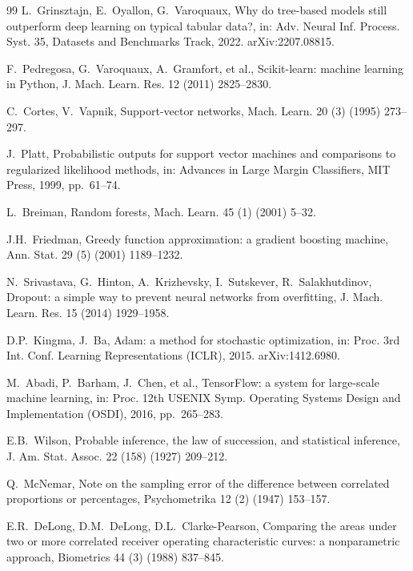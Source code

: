 \documentclass[5p,times,twocolumn]{elsarticle}
\begin{document}
\begin{thebibliography}{99}
L.~Grinsztajn, E.~Oyallon, G.~Varoquaux, Why do tree-based models still outperform deep learning on typical tabular data?, in: Adv. Neural Inf. Process. Syst. 35, Datasets and Benchmarks Track, 2022. arXiv:2207.08815.

F.~Pedregosa, G.~Varoquaux, A.~Gramfort, et al., Scikit-learn: machine learning in Python, J. Mach. Learn. Res. 12 (2011) 2825--2830.

C.~Cortes, V.~Vapnik, Support-vector networks, Mach. Learn. 20 (3) (1995) 273--297.

J.~Platt, Probabilistic outputs for support vector machines and comparisons to regularized likelihood methods, in: Advances in Large Margin Classifiers, MIT Press, 1999, pp.~61--74.

L.~Breiman, Random forests, Mach. Learn. 45 (1) (2001) 5--32.

J.H.~Friedman, Greedy function approximation: a gradient boosting machine, Ann. Stat. 29 (5) (2001) 1189--1232.

N.~Srivastava, G.~Hinton, A.~Krizhevsky, I.~Sutskever, R.~Salakhutdinov, Dropout: a simple way to prevent neural networks from overfitting, J. Mach. Learn. Res. 15 (2014) 1929--1958.

D.P.~Kingma, J.~Ba, Adam: a method for stochastic optimization, in: Proc. 3rd Int. Conf. Learning Representations (ICLR), 2015. arXiv:1412.6980.

M.~Abadi, P.~Barham, J.~Chen, et al., TensorFlow: a system for large-scale machine learning, in: Proc. 12th USENIX Symp. Operating Systems Design and Implementation (OSDI), 2016, pp.~265--283.

E.B.~Wilson, Probable inference, the law of succession, and statistical inference, J. Am. Stat. Assoc. 22 (158) (1927) 209--212.

Q.~McNemar, Note on the sampling error of the difference between correlated proportions or percentages, Psychometrika 12 (2) (1947) 153--157.

E.R.~DeLong, D.M.~DeLong, D.L.~Clarke-Pearson, Comparing the areas under two or more correlated receiver operating characteristic curves: a nonparametric approach, Biometrics 44 (3) (1988) 837--845.

\end{thebibliography}
\end{document}
